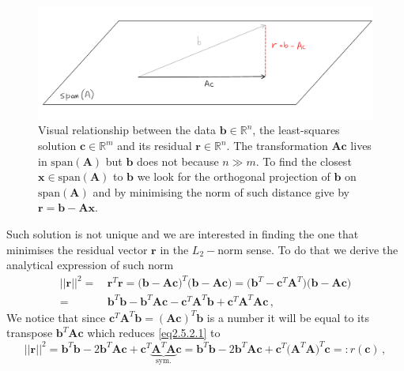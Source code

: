 \documentclass[../main.tex]{subfiles}
\begin{document}
\begin{figure}[H]
    \centering 
    \includegraphics[keepaspectratio, width=\textwidth]{../figures/fig2.5.2.1.pdf}
    \caption{Visual relationship between the data $\boldsymbol{b}\in \mathbb{R}^{n}$, the least-squares solution $\boldsymbol{c}\in \mathbb{R}^{m}$ and its residual $\boldsymbol{r}\in \mathbb{R}^{n}$. The transformation $\boldsymbol{Ac}$ lives in $\text{span}(\boldsymbol{A})$ but $\boldsymbol{b}$ does not because $n\gg m$. To find the closest $\boldsymbol{x}\in \text{span}(\boldsymbol{A})$ to $\boldsymbol{b}$ we look for the orthogonal projection of $\boldsymbol{b}$ on $\text{span}(\boldsymbol{A})$ and by minimising the norm of such distance give by $\boldsymbol{r}=\boldsymbol{b}-\boldsymbol{Ax}$.}
    \label{fig2.5.2.1}
\end{figure}
Such solution is not unique and we are interested in finding the one that minimises the residual vector $\boldsymbol{r}$ in the $L_{2}-$norm sense.
To do that we derive the analytical expression of such norm 
\begin{align}
     ||\boldsymbol{r}||^{2} =&\, \boldsymbol{r}^{T}\boldsymbol{r} = \big(\boldsymbol{b}-\boldsymbol{Ac}\big)^{T}\big(\boldsymbol{b}-\boldsymbol{Ac}\big) = \big(\boldsymbol{b}^{T} -\boldsymbol{c}^{T}\boldsymbol{A}^{T}\big)\big(\boldsymbol{b}-\boldsymbol{Ac}\big)\nonumber \\
                            =&\, \boldsymbol{b}^{T}\boldsymbol{b} - \boldsymbol{b}^{T}\boldsymbol{Ac} - \boldsymbol{c}^{T}\boldsymbol{A}^{T}\boldsymbol{b} + \boldsymbol{c}^{T}\boldsymbol{A}^{T}\boldsymbol{A}\boldsymbol{c} \,, \label{eq2.5.2.1} 
\end{align}
We notice that since $\boldsymbol{c}^{T}\boldsymbol{A}^{T}\boldsymbol{b} = (\boldsymbol{A}\boldsymbol{c})^{T}\boldsymbol{b}$ is a number it will be equal to its transpose $\boldsymbol{b}^{T}\boldsymbol{Ac}$ which reduces \eqref{eq2.5.2.1} to 
\begin{equation}\label{eq2.5.2.2}
        ||\boldsymbol{r}||^{2} = \boldsymbol{b}^{T}\boldsymbol{b} - 2\boldsymbol{b}^{T}\boldsymbol{Ac} + \boldsymbol{c}^{T}\underbrace{\boldsymbol{A}^{T}\boldsymbol{A}}_{\text{sym.}}\boldsymbol{c} = \boldsymbol{b}^{T}\boldsymbol{b} - 2\boldsymbol{b}^{T}\boldsymbol{Ac} + \boldsymbol{c}^{T}\big(\boldsymbol{A}^{T}\boldsymbol{A}\big)^T\boldsymbol{c} =: r(\boldsymbol{c})\,,
\end{equation}
\end{document}
